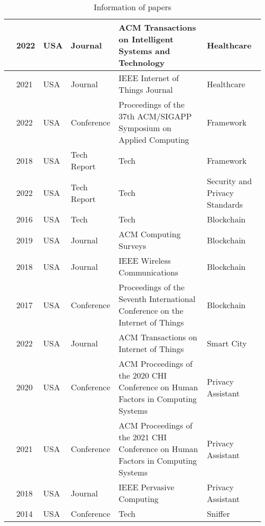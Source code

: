 \begin{table}
\begin{center}
\begin{longtable}{p{1.2cm} p{1cm} p{1.5cm} p{3.2cm} p{5cm} p{3cm}}
            \cite{AntunesFederated} & 2022 & USA & Journal & ACM Transactions on Intelligent Systems and Technology & Healthcare \\
            \hline
            \cite{ChenSecurity} & 2021 & USA & Journal & IEEE Internet of Things Journal & Healthcare \\
            \hline
            \cite{opara2022framework} & 2022 & USA & Conference & Proceedings of the 37th ACM/SIGAPP Symposium on Applied Computing & Framework \\
            \hline
            \cite{barrett2018framework} & 2018 & USA & Tech Report & Tech & Framework \\
            \hline
            \cite{iso2022cybersecurity} & 2022 & USA & Tech Report & Tech & Security and Privacy Standards \\
            \hline
            \cite{mercer2016privacy} & 2016 & USA & Tech & Tech & Blockchain \\
            \hline
            \cite{zhang2019security} & 2019 & USA & Journal & ACM Computing Surveys & Blockchain \\
            \hline
            \cite{yu2018blockchain} & 2018 & USA & Journal & IEEE Wireless Communications & Blockchain \\
            \hline
            \cite{AliIoT} & 2017 & USA & Conference & Proceedings of the Seventh International Conference on the Internet of Things & Blockchain \\
            \hline
            \cite{ZhuIntegrating} & 2022 & USA & Journal & ACM Transactions on Internet of Things & Smart City \\
            \hline
            \cite{ColnagoInforming} & 2020 & USA & Conference & ACM Proceedings of the 2020 CHI Conference on Human Factors in Computing Systems & Privacy Assistant \\
            \hline
            \cite{FengDesign} & 2021 & USA & Conference & ACM Proceedings of the 2021 CHI Conference on Human Factors in Computing Systems & Privacy Assistant \\
            \hline
            \cite{DasPersonalized} & 2018 & USA & Journal & IEEE Pervasive Computing & Privacy Assistant \\
            \hline
            \cite{KumarLTE} & 2014 & USA & Conference & Tech & Sniffer \\
            \hline
        \end{longtable}
    \end{center}
    \vspace{1em}
    \caption{Information of papers}
    \label{table:literature_overview}
\end{table}

